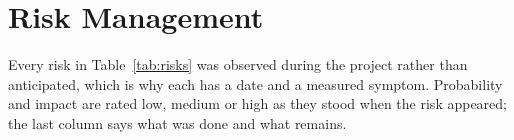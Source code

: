 
\section{Risk Management}
\label{sec:risks}

Every risk in Table~\ref{tab:risks} was observed during the project
rather than anticipated, which is why each has a date and a measured
symptom. Probability and impact are rated low, medium or high as they
stood when the risk appeared; the last column says what was done and
what remains.

